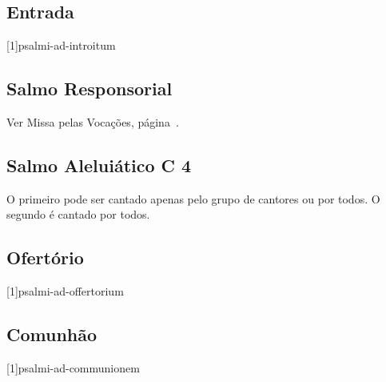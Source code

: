 
\subsection{Entrada}\label{subsection:missae-pro-varii-necessitatibus/pro-unitate-christianorum/introitus}
[1]{psalmi-ad-introitum}

\subsection[Salmo Responsorial]{Salmo Responsorial}
\begin{rubrica}
  Ver Missa pelas Vocações, página~\pageref{subsection:missae-pro-varii-necessitatibus/pro-vocationibus/psalmus-responsorius}.
\end{rubrica}

\subsection[Salmo Aleluiático]{Salmo Aleluiático \textmd{C 4}}\label{subsection:missae-pro-varii-necessitatibus/pro-unitate-christianorum/psalmus-alleluiaticus}
\begin{rubrica}
    O primeiro {\normalfont\Rbar} pode ser cantado apenas pelo grupo de cantores ou por todos. O segundo {\normalfont\Rbar} é cantado por todos.
  \end{rubrica}

\AllowPageFlush

\subsection{Ofertório}\label{subsection:missae-pro-varii-necessitatibus/pro-unitate-christianorum/offertorium}
[1]{psalmi-ad-offertorium}

\AllowPageFlush

\subsection{Comunhão}\label{subsection:missae-pro-varii-necessitatibus/pro-unitate-christianorum/communio}
[1]{psalmi-ad-communionem}